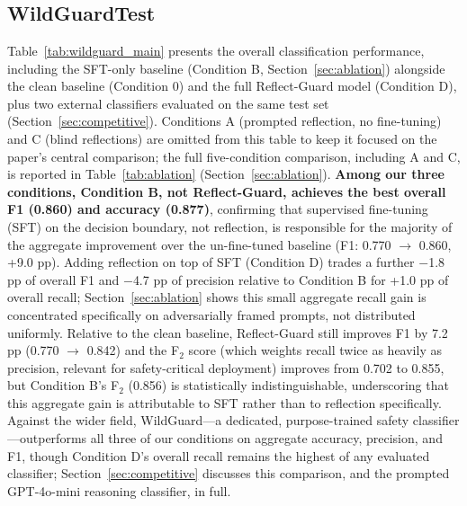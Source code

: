 \documentclass[superintelligence,article,accept,moreauthors]{Definitions/mdpi}
\begin{document}
\section{ %
}
\label{sec:results}

\subsection{WildGuardTest}

Table~\ref{tab:wildguard_main} presents the overall classification performance, including the SFT-only baseline (Condition B, Section~\ref{sec:ablation}) alongside the clean baseline (Condition 0) and the full Reflect-Guard model (Condition D), plus two external classifiers evaluated on the same test set (Section~\ref{sec:competitive}). Conditions A (prompted reflection, no fine-tuning) and C (blind reflections) are omitted from this table to keep it focused on the paper's central comparison; the full five-condition comparison, including A and C, is reported in Table~\ref{tab:ablation} (Section~\ref{sec:ablation}). \textbf{Among our three conditions, Condition B, not Reflect-Guard, achieves the best overall F1 (0.860) and accuracy (0.877)}, confirming that supervised fine-tuning (SFT) on the decision boundary, not reflection, is responsible for the majority of the aggregate improvement over the un-fine-tuned baseline (F1: 0.770 $\to$ 0.860, +9.0 pp). Adding reflection on top of SFT (Condition D) trades a further $-$1.8 pp of overall F1 and $-$4.7 pp of precision relative to Condition B for +1.0 pp of overall recall; Section~\ref{sec:ablation} shows this small aggregate recall gain is concentrated specifically on adversarially framed prompts, not distributed uniformly. Relative to the clean baseline, Reflect-Guard still improves F1 by 7.2 pp (0.770 $\to$ 0.842) and the F$_2$ score (which weights recall twice as heavily as precision, relevant for safety-critical deployment) improves from 0.702 to 0.855, but Condition B's F$_2$ (0.856) is statistically indistinguishable, underscoring that this aggregate gain is attributable to SFT rather than to reflection specifically. Against the wider field, WildGuard---a dedicated, purpose-trained safety classifier---outperforms all three of our conditions on aggregate accuracy, precision, and F1, though Condition D's overall recall remains the highest of any evaluated classifier; Section~\ref{sec:competitive} discusses this comparison, and the prompted GPT-4o-mini reasoning classifier, in full.
\end{document}
